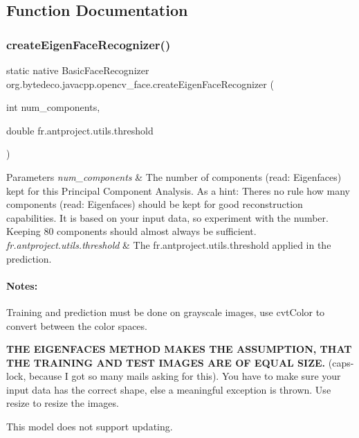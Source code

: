 \subsection{Function Documentation}
\mbox{\label{group__face_ga6f3a56396530d46af3fba9ad04fc80cf}} 
\subsubsection{\texorpdfstring{create\+Eigen\+Face\+Recognizer()}{createEigenFaceRecognizer()}}
{\footnotesize\ttfamily static native Basic\+Face\+Recognizer org.\+bytedeco.\+javacpp.\+opencv\+\_\+face.\+create\+Eigen\+Face\+Recognizer (\begin{DoxyParamCaption}\item[{int}]{num\+\_\+components,  }\item[{double}]{fr.antproject.utils.threshold }\end{DoxyParamCaption})\hspace{0.3cm}{\ttfamily [static]}}


\begin{DoxyParams}{Parameters}
{\em num\+\_\+components} & The number of components (read\+: Eigenfaces) kept for this Principal Component Analysis. As a hint\+: There\textquotesingle{}s no rule how many components (read\+: Eigenfaces) should be kept for good reconstruction capabilities. It is based on your input data, so experiment with the number. Keeping 80 components should almost always be sufficient. \\
\hline
{\em fr.antproject.utils.threshold} & The fr.antproject.utils.threshold applied in the prediction. \\
\hline
\end{DoxyParams}
\paragraph*{Notes\+:}


\begin{DoxyItemize}
\item Training and prediction must be done on grayscale images, use cvt\+Color to convert between the color spaces.
\item {\bfseries T\+HE E\+I\+G\+E\+N\+F\+A\+C\+ES M\+E\+T\+H\+OD M\+A\+K\+ES T\+HE A\+S\+S\+U\+M\+P\+T\+I\+ON, T\+H\+AT T\+HE T\+R\+A\+I\+N\+I\+NG A\+ND T\+E\+ST I\+M\+A\+G\+ES A\+RE OF E\+Q\+U\+AL S\+I\+ZE.} (caps-\/lock, because I got so many mails asking for this). You have to make sure your input data has the correct shape, else a meaningful exception is thrown. Use resize to resize the images.
\item This model does not support updating. 
\end{DoxyItemize}

